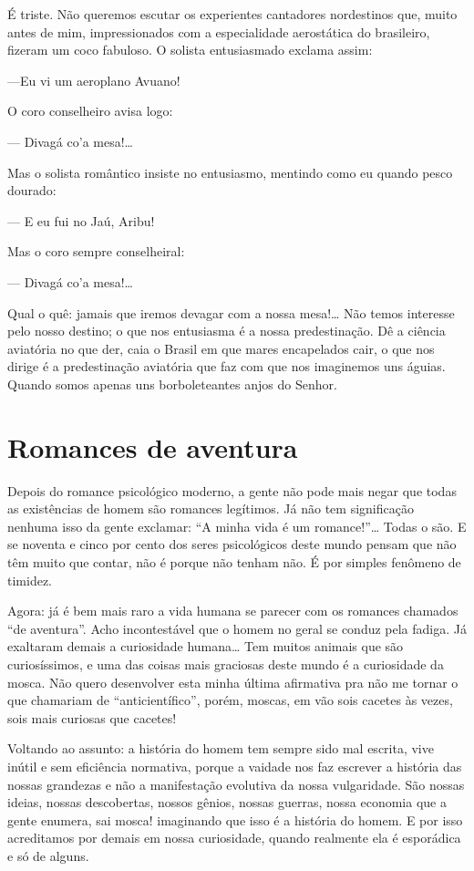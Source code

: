 É triste. Não queremos escutar os experientes cantadores nordestinos
que, muito antes de mim, impressionados com a especialidade aerostática
do brasileiro, fizeram um coco fabuloso. O solista entusiasmado exclama
assim:

---Eu vi um aeroplano Avuano!

O coro conselheiro avisa logo:

--- Divagá co'a mesa!\ldots{}

Mas o solista romântico insiste no entusiasmo, mentindo como eu quando
pesco dourado:

--- E eu fui no Jaú, Aribu!

Mas o coro sempre conselheiral:

--- Divagá co'a mesa!\ldots{}

Qual o quê: jamais que iremos devagar com a nossa mesa!\ldots{} Não temos
interesse pelo nosso destino; o que nos entusiasma é a nossa
predestinação. Dê a ciência aviatória no que der, caia o Brasil em que
mares encapelados cair, o que nos dirige é a predestinação aviatória que
faz com que nos imaginemos uns águias. Quando somos apenas uns
borboleteantes anjos do Senhor.

\chapter{Romances de aventura}

Depois do romance psicológico moderno, a gente não pode mais negar que
todas as existências de homem são romances legítimos. Já não tem
significação nenhuma isso da gente exclamar: ``A minha vida é um
romance!''\ldots{} Todas o são. E se noventa e cinco por cento dos seres
psicológicos deste mundo pensam que não têm muito que contar, não é
porque não tenham não. É por simples fenômeno de timidez.

Agora: já é bem mais raro a vida humana se parecer com os romances
chamados ``de aventura''. Acho incontestável que o homem no geral se
conduz pela fadiga. Já exaltaram demais a curiosidade humana\ldots{} Tem
muitos animais que são curiosíssimos, e uma das coisas mais graciosas
deste mundo é a curiosidade da mosca. Não quero desenvolver esta minha
última afirmativa pra não me tornar o que chamariam de ``anticientífico'',
porém, moscas, em vão sois cacetes às vezes, sois mais curiosas que
cacetes!

Voltando ao assunto: a história do homem tem sempre sido mal escrita,
vive inútil e sem eficiência normativa, porque a vaidade nos faz
escrever a história das nossas grandezas e não a manifestação evolutiva
da nossa vulgaridade. São nossas ideias, nossas descobertas, nossos
gênios, nossas guerras, nossa economia que a gente enumera, sai mosca!
imaginando que isso é a história do homem. E por isso acreditamos por
demais em nossa curiosidade, quando realmente ela é esporádica e só de
alguns.


